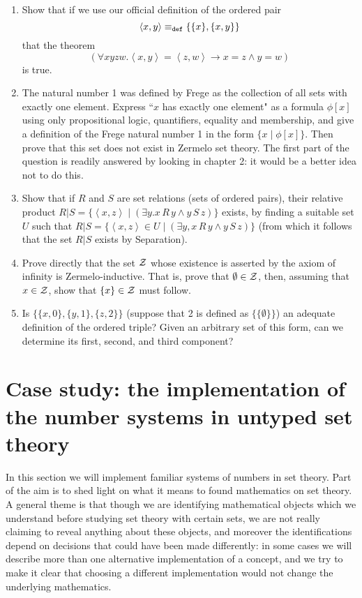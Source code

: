 \documentclass[12pt]{book}
\begin{document}
\begin{enumerate}
\begin{enumerate}
\end{enumerate}



\item  Show that if we use our official definition of the ordered pair $$\left<x,y\right> \equiv_{\tt def} \{\{x\},\{x,y\}\}$$ that the theorem $$(\forall xyzw.\left<x,y\right>=\left<z,w\right> \rightarrow x=z \wedge y=w)$$ is true.

\item The natural number 1 was defined by Frege as the collection of all sets with exactly one element.  Express ``$x$ has exactly one element" as a formula $\phi[x]$ using only propositional logic, quantifiers, equality and membership, and give a definition of the Frege natural number 1 in the form $\{x \mid \phi[x]\}$.  Then prove that this set does not exist in Zermelo set theory.  The first part of the question is readily answered by looking in chapter 2:  it would be a better idea not to do this.

\item Show that if $R$ and $S$ are set relations (sets of ordered pairs), their relative product $R|S = \{\left<x,z\right> \mid (\exists y.x \,R\,y \wedge y \,S\,z)\}$ exists, by finding a suitable set $U$ such that $R|S = \{\left<x,z\right> \in U \mid (\exists y,x \,R\,y \wedge y \,S\,z)\}$ (from which it follows that the set $R|S$ exists by Separation).

\item  Prove directly that the set $\cal Z$ whose existence is asserted by the axiom of infinity is Zermelo-inductive.  That is, prove that $\emptyset \in \cal Z$, then, assuming that $x \in \cal Z$, show that $\{x\} \in \cal Z$ must follow.

\item Is $\{\{x,0\},\{y,1\},\{z,2\}\}$ (suppose that 2 is defined as $\{\{\emptyset\}\}$) an adequate definition of the ordered triple?  Given an arbitrary set of this form, can we determine its first, second, and third component?

\end{enumerate}

\newpage

\section{Case study:  the implementation of the number systems in untyped set theory}

In this section we will implement familiar systems of numbers in set theory.   Part of the aim is to shed light on what it means to found mathematics on set theory.  A general theme is that though we are identifying mathematical objects which we understand before studying set theory with certain sets, we are not really claiming to reveal anything about these objects, and moreover the identifications depend on decisions that could have been made differently:  in some cases we will describe more than one alternative implementation of a concept, and we try to make it clear that choosing a different implementation would not change the underlying mathematics.
\end{document}
